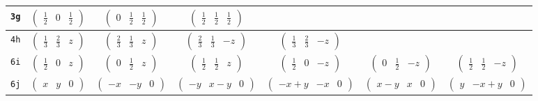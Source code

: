 \documentclass[fleqn,9pt,landscape]{jsarticle}
\begin{document}
\begin{center}
\begin{longtable}{ccccccc}
{\tt 3g} & $ \begin{pmatrix} \frac{1}{2} & 0 & \frac{1}{2} \end{pmatrix} $ & $ \begin{pmatrix} 0 & \frac{1}{2} & \frac{1}{2} \end{pmatrix} $ & $ \begin{pmatrix} \frac{1}{2} & \frac{1}{2} & \frac{1}{2} \end{pmatrix} $ & $  $ & $  $ & $  $ \\ \hline
{\tt 4h} & $ \begin{pmatrix} \frac{1}{3} & \frac{2}{3} & z \end{pmatrix} $ & $ \begin{pmatrix} \frac{2}{3} & \frac{1}{3} & z \end{pmatrix} $ & $ \begin{pmatrix} \frac{2}{3} & \frac{1}{3} & - z \end{pmatrix} $ & $ \begin{pmatrix} \frac{1}{3} & \frac{2}{3} & - z \end{pmatrix} $ & $  $ & $  $ \\ \hline
{\tt 6i} & $ \begin{pmatrix} \frac{1}{2} & 0 & z \end{pmatrix} $ & $ \begin{pmatrix} 0 & \frac{1}{2} & z \end{pmatrix} $ & $ \begin{pmatrix} \frac{1}{2} & \frac{1}{2} & z \end{pmatrix} $ & $ \begin{pmatrix} \frac{1}{2} & 0 & - z \end{pmatrix} $ & $ \begin{pmatrix} 0 & \frac{1}{2} & - z \end{pmatrix} $ & $ \begin{pmatrix} \frac{1}{2} & \frac{1}{2} & - z \end{pmatrix} $ \\ \hline
{\tt 6j} & $ \begin{pmatrix} x & y & 0 \end{pmatrix} $ & $ \begin{pmatrix} - x & - y & 0 \end{pmatrix} $ & $ \begin{pmatrix} - y & x - y & 0 \end{pmatrix} $ & $ \begin{pmatrix} - x + y & - x & 0 \end{pmatrix} $ & $ \begin{pmatrix} x - y & x & 0 \end{pmatrix} $ & $ \begin{pmatrix} y & - x + y & 0 \end{pmatrix} $ \\ \hline

\end{longtable}
\end{center}
\end{document}
